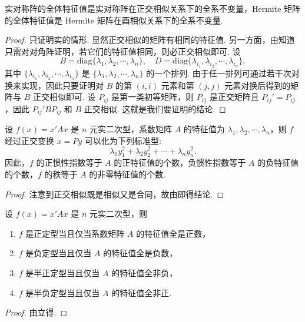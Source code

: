 \documentclass[../../main.tex]{subfiles}%
\begin{document}
\begin{corollary}\label{corollary:实对称和Hermite矩阵的全系不变量}
实对称阵的全体特征值是实对称阵在正交相似关系下的全系不变量，Hermite 矩阵的全体特征值是 Hermite 矩阵在酉相似关系下的全系不变量.
\end{corollary}
\begin{proof}
只证明实的情形. 显然正交相似的矩阵有相同的特征值. 另一方面，由知道只需对对角阵证明，若它们的特征值相同，则必正交相似即可. 设
\[
B = \mathrm{diag}\{\lambda_1,\lambda_2,\cdots,\lambda_n\}, \quad D = \mathrm{diag}\{\lambda_{i_1},\lambda_{i_2},\cdots,\lambda_{i_n}\},
\]
其中 $\{\lambda_{i_1},\lambda_{i_2},\cdots,\lambda_{i_n}\}$ 是 $\{\lambda_1,\lambda_2,\cdots,\lambda_n\}$ 的一个排列. 由于任一排列可通过若干次对换来实现，因此只要证明对 $B$ 的第 $(i,i)$ 元素和第 $(j,j)$ 元素对换后得到的矩阵与 $B$ 正交相似即可. 设 $P_{ij}$ 是第一类初等矩阵，则 $P_{ij}$ 是正交矩阵且 $P_{ij}' = P_{ij}$，因此 $P_{ij}'BP_{ij}$ 和 $B$ 正交相似. 这就是我们要证明的结论.
\end{proof}

\begin{theorem}\label{theorem:二次型经正交变换后可化为标准型}
设 $f(x) = x'Ax$ 是 $n$ 元实二次型，系数矩阵 $A$ 的特征值为 $\lambda_1,\lambda_2,\cdots,\lambda_n$，则 $f$ 经过正交变换 $x = Py$ 可以化为下列标准型:
\[
\lambda_1y_1^2 + \lambda_2y_2^2 + \cdots + \lambda_ny_n^2.
\]
因此，$f$ 的正惯性指数等于 $A$ 的正特征值的个数，负惯性指数等于 $A$ 的负特征值的个数，$f$ 的秩等于 $A$ 的非零特征值的个数.
\end{theorem}
\begin{proof}
注意到正交相似既是相似又是合同，故由即得结论. 
\end{proof}

\begin{corollary}\label{corollary:二次型式(半)正定型(负定型)的充要条件}
设 $f(x) = x'Ax$ 是 $n$ 元实二次型，则 
\begin{enumerate}
\item $f$ 是正定型当且仅当系数矩阵 $A$ 的特征值全是正数，

\item $f$ 是负定型当且仅当 $A$ 的特征值全是负数，

\item $f$ 是半正定型当且仅当 $A$ 的特征值全非负，

\item $f$ 是半负定型当且仅当 $A$ 的特征值全非正.
\end{enumerate}
\end{corollary}
\begin{proof}
由立得.
\end{proof}
\end{document}
